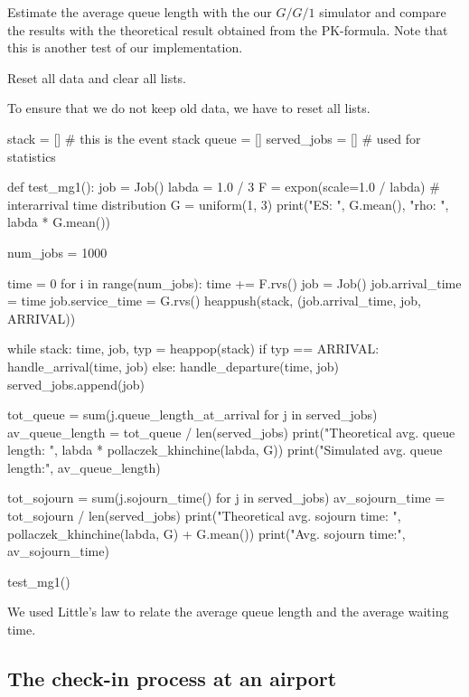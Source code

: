 \begin{exercise}
  Estimate the average queue length with the our $G/G/1$ simulator and compare the results with the theoretical result obtained from the PK-formula.
  Note that this is another test of our implementation.
\begin{hint}
Reset all data and clear all lists.
\end{hint}

\begin{solution}
To ensure that we do not keep old data, we have to reset all lists.

\begin{pyverbatim}
stack = []  # this is the event stack
queue = []
served_jobs = []  # used for statistics


def test_mg1():
    job = Job()
    labda = 1.0 / 3
    F = expon(scale=1.0 / labda)  # interarrival time distribution
    G = uniform(1, 3)
    print("ES: ", G.mean(), "rho: ", labda * G.mean())

    num_jobs = 1000

    time = 0
    for i in range(num_jobs):
        time += F.rvs()
        job = Job()
        job.arrival_time = time
        job.service_time = G.rvs()
        heappush(stack, (job.arrival_time, job, ARRIVAL))

    while stack:
        time, job, typ = heappop(stack)
        if typ == ARRIVAL:
            handle_arrival(time, job)
        else:
            handle_departure(time, job)
            served_jobs.append(job)

    tot_queue = sum(j.queue_length_at_arrival for j in served_jobs)
    av_queue_length = tot_queue / len(served_jobs)
    print("Theoretical avg. queue length: ", labda * pollaczek_khinchine(labda, G))
    print("Simulated avg. queue length:", av_queue_length)

    tot_sojourn = sum(j.sojourn_time() for j in served_jobs)
    av_sojourn_time = tot_sojourn / len(served_jobs)
    print("Theoretical avg. sojourn time: ", pollaczek_khinchine(labda, G) + G.mean())
    print("Avg. sojourn time:", av_sojourn_time)


test_mg1()
\end{pyverbatim}
We used Little's law to relate the average queue length and the average waiting time.
  \end{solution}
\end{exercise}




\subsection{The check-in process at an airport}
\label{sec:check-in-process-at}

